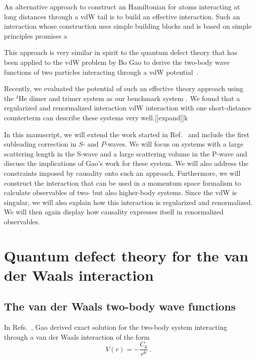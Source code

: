 \documentclass[aps,preprint,superscriptaddress]{revtex4-1}
\begin{document}
An alternative approach to construct an Hamiltonian for atoms
interacting at long distances through a vdW tail is to build an
effective interaction. Such an interaction whose construction uses
simple building blocks and is based on simple principles promises a 

This approach is very similar in spirit to the quantum defect theory
that has been applied to the vdW problem by Bo Gao to derive the
two-body wave functions of two particles interacting through a vdW
potential~\cite{PhysRevA.58.1728}.

Recently, we evaluated the potential of such an effective theory
approach using the $^4$He dimer and trimer system as our benchmark
system \cite{Odell:2021ryo}. We found that a regularized and
renormalized interaction vdW interaction with one short-distance
counterterm can describe these systems very well.[[expand]]k

In this manuscript, we will extend the work started in
Ref.~\cite{Odell:2021ryo} and include the first subleading correction
in $S$- and $P$-waves. We will focus on systems with a large
scattering length in the S-wave and a large scattering volume in the
P-wave and discuss the implications of Gao's work for these system. We
will also address the constraints imposed by causality onto such an
approach.  Furthermore, we will construct the interaction that can be
used in a momentum space formalism to calculate observables of two-
but also higher-body systems. Since the vdW is singular, we will also
explain how this interaction is regularized and renormalized. We will
then again display how causality expresses itself in renormalized observables.

\section{Quantum defect theory for the van der Waals interaction}
\label{sec:vdw-interaction}
\subsection{The van der Waals two-body wave functions}
\label{sec:gao}
In Refs.~\cite{PhysRevA.58.1728}, Gao derived exact solution for the
two-body system interacting through a van der Waals interaction of the
form
\begin{equation}
  \label{eq:v_vdW}
  V(r) = -\frac{C_6}{r^6}~.
\end{equation}
\end{document}
